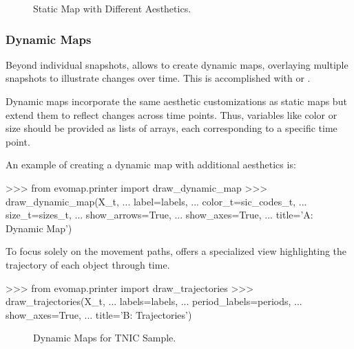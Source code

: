 \documentclass[article]{jss}
\begin{document}
\begin{figure}[hbt!]
  \centering
  \caption{\label{fig:draw-map-illustrations} Static Map with Different Aesthetics.}
\end{figure}
  
\subsubsection{Dynamic Maps}

Beyond individual snapshots,  allows to create dynamic maps, 
overlaying multiple snapshots to illustrate changes over time. 
This is accomplished with  or .

Dynamic maps incorporate the same aesthetic customizations as static maps but extend them to reflect changes 
across time points. Thus, variables like color or size should be provided as lists of arrays, each corresponding
 to a specific time point.

An example of creating a dynamic map with additional aesthetics is:

\begin{CodeChunk}
\begin{CodeInput}
>>> from evomap.printer import draw_dynamic_map
>>> draw_dynamic_map(X_t,
...     label=labels,
...     color_t=sic_codes_t,
...     size_t=sizes_t,
...     show_arrows=True,
...     show_axes=True,
...     title='A: Dynamic Map')  
\end{CodeInput}
\end{CodeChunk}

To focus solely on the movement paths,  
offers a specialized view highlighting the trajectory of each object through time.

\begin{CodeChunk}
\begin{CodeInput}
>>> from evomap.printer import draw_trajectories
>>> draw_trajectories(X_t,
...     labels=labels,
...     period_labels=periods,
...     show_axes=True,
...     title='B: Trajectories')  
\end{CodeInput}
\end{CodeChunk}

\begin{figure}[hbt!]
  \centering
  \caption{\label{fig:draw-dynamic-map-and-trajectories} Dynamic Maps for TNIC Sample.}
\end{figure}
\end{document}
